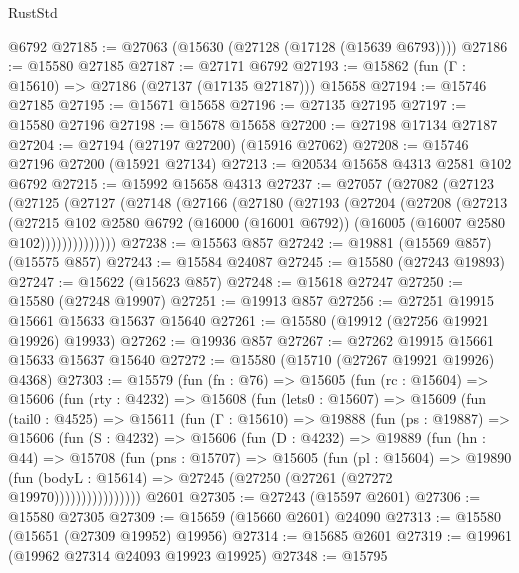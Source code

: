 \begin{lexlean}{RustStd}
\begin{coremodule}
    @6792
@27185 := @27063 (@15630 (@27128 (@17128 (@15639 @6793))))
@27186 := @15580 @27185
@27187 := @27171 @6792
@27193 := @15862 (fun (Γ : @15610) => @27186 (@27137 (@17135 @27187))) @15658
@27194 := @15746 @27185
@27195 := @15671 @15658
@27196 := @27135 @27195
@27197 := @15580 @27196
@27198 := @15678 @15658
@27200 := @27198 @17134 @27187
@27204 := @27194 (@27197 @27200) (@15916 @27062)
@27208 := @15746 @27196 @27200 (@15921 @27134)
@27213 := @20534 @15658 @4313 @2581 @102 @6792
@27215 := @15992 @15658 @4313
@27237 := @27057
    (@27082
      (@27123
        (@27125
          (@27127
            (@27148
              (@27166
                (@27180
                  (@27193
                    (@27204
                      (@27208
                        (@27213
                          (@27215
                            @102
                            @2580
                            @6792
                            (@16000 (@16001 @6792))
                            (@16005 (@16007 @2580 @102))))))))))))))
@27238 := @15563 @857
@27242 := @19881 (@15569 @857) (@15575 @857)
@27243 := @15584 @24087
@27245 := @15580 (@27243 @19893)
@27247 := @15622 (@15623 @857)
@27248 := @15618 @27247
@27250 := @15580 (@27248 @19907)
@27251 := @19913 @857
@27256 := @27251 @19915 @15661 @15633 @15637 @15640
@27261 := @15580 (@19912 (@27256 @19921 @19926) @19933)
@27262 := @19936 @857
@27267 := @27262 @19915 @15661 @15633 @15637 @15640
@27272 := @15580 (@15710 (@27267 @19921 @19926) @4368)
@27303 := @15579
    (fun (fn : @76) =>
    @15605
      (fun (rc : @15604) =>
      @15606
        (fun (rty : @4232) =>
        @15608
          (fun (lets0 : @15607) =>
          @15609
            (fun (tail0 : @4525) =>
            @15611
              (fun (Γ : @15610) =>
              @19888
                (fun (ps : @19887) =>
                @15606
                  (fun (S : @4232) =>
                  @15606
                    (fun (D : @4232) =>
                    @19889
                      (fun (hn : @44) =>
                      @15708
                        (fun (pns : @15707) =>
                        @15605
                          (fun (pl : @15604) =>
                          @19890
                            (fun (bodyL : @15614) =>
                            @27245 (@27250 (@27261 (@27272 @19970))))))))))))))))
    @2601
@27305 := @27243 (@15597 @2601)
@27306 := @15580 @27305
@27309 := @15659 (@15660 @2601) @24090
@27313 := @15580 (@15651 (@27309 @19952) @19956)
@27314 := @15685 @2601
@27319 := @19961 (@19962 @27314 @24093 @19923 @19925)
@27348 := @15795

\end{coremodule}
\end{lexlean}
